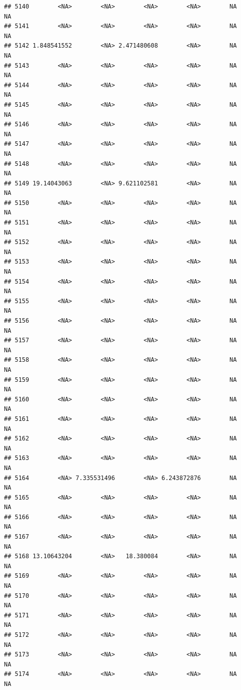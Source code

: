 \documentclass[12pt, a4paper]{article}\usepackage[]{graphicx}\usepackage[]{color}
\makeatletter
\newenvironment{kframe}{%
 \def\at@end@of@kframe{}%
 \ifinner\ifhmode%
  \def\at@end@of@kframe{\end{minipage}}%
  \begin{minipage}{\columnwidth}%
 \fi\fi%
 \def\FrameCommand##1{\hskip\@totalleftmargin \hskip-\fboxsep
 \colorbox{shadecolor}{##1}\hskip-\fboxsep
     \hskip-\linewidth \hskip-\@totalleftmargin \hskip\columnwidth}%
 \MakeFramed {\advance\hsize-\width
   \@totalleftmargin\z@ \linewidth\hsize
   \@setminipage}}%
 {\par\unskip\endMakeFramed%
 \at@end@of@kframe}
\newenvironment{knitrout}{}{} %
\makeatother
\begin{document}
\begin{knitrout}
\begin{kframe}
\begin{verbatim}
## 5140        <NA>        <NA>        <NA>        <NA>        NA        NA
## 5141        <NA>        <NA>        <NA>        <NA>        NA        NA
## 5142 1.848541552        <NA> 2.471480608        <NA>        NA        NA
## 5143        <NA>        <NA>        <NA>        <NA>        NA        NA
## 5144        <NA>        <NA>        <NA>        <NA>        NA        NA
## 5145        <NA>        <NA>        <NA>        <NA>        NA        NA
## 5146        <NA>        <NA>        <NA>        <NA>        NA        NA
## 5147        <NA>        <NA>        <NA>        <NA>        NA        NA
## 5148        <NA>        <NA>        <NA>        <NA>        NA        NA
## 5149 19.14043063        <NA> 9.621102581        <NA>        NA        NA
## 5150        <NA>        <NA>        <NA>        <NA>        NA        NA
## 5151        <NA>        <NA>        <NA>        <NA>        NA        NA
## 5152        <NA>        <NA>        <NA>        <NA>        NA        NA
## 5153        <NA>        <NA>        <NA>        <NA>        NA        NA
## 5154        <NA>        <NA>        <NA>        <NA>        NA        NA
## 5155        <NA>        <NA>        <NA>        <NA>        NA        NA
## 5156        <NA>        <NA>        <NA>        <NA>        NA        NA
## 5157        <NA>        <NA>        <NA>        <NA>        NA        NA
## 5158        <NA>        <NA>        <NA>        <NA>        NA        NA
## 5159        <NA>        <NA>        <NA>        <NA>        NA        NA
## 5160        <NA>        <NA>        <NA>        <NA>        NA        NA
## 5161        <NA>        <NA>        <NA>        <NA>        NA        NA
## 5162        <NA>        <NA>        <NA>        <NA>        NA        NA
## 5163        <NA>        <NA>        <NA>        <NA>        NA        NA
## 5164        <NA> 7.335531496        <NA> 6.243872876        NA        NA
## 5165        <NA>        <NA>        <NA>        <NA>        NA        NA
## 5166        <NA>        <NA>        <NA>        <NA>        NA        NA
## 5167        <NA>        <NA>        <NA>        <NA>        NA        NA
## 5168 13.10643204        <NA>   18.380084        <NA>        NA        NA
## 5169        <NA>        <NA>        <NA>        <NA>        NA        NA
## 5170        <NA>        <NA>        <NA>        <NA>        NA        NA
## 5171        <NA>        <NA>        <NA>        <NA>        NA        NA
## 5172        <NA>        <NA>        <NA>        <NA>        NA        NA
## 5173        <NA>        <NA>        <NA>        <NA>        NA        NA
## 5174        <NA>        <NA>        <NA>        <NA>        NA        NA

\end{verbatim}
\end{kframe}
\end{knitrout}
\end{document}
